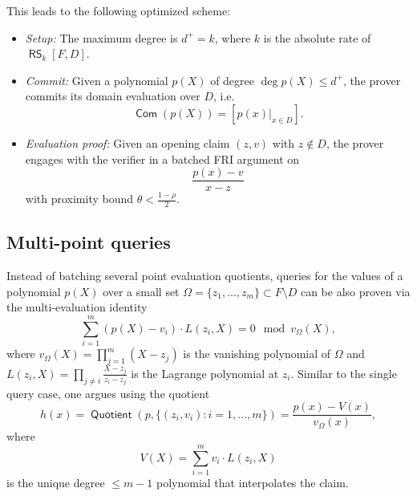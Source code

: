 \documentclass[11pt,article,oneside]{memoir}
\theoremstyle{definition}
\theoremstyle{remark}
\DeclareMathOperator{\comm}{\mathsf{Com}}
\DeclareMathOperator{\RS}{\mathsf{RS}}
\DeclareMathOperator{\Quotient}{\mathsf{Quotient}}
\begin{document}

This leads to the following optimized scheme:
\begin{itemize}
\item
\textit{Setup:} 
The maximum degree is $d^+ = k$, where $k$ is the absolute rate of $\RS_k[F,D]$.
\item
\textit{Commit:} 
Given a polynomial $p(X)$ of degree $\deg p(X)\leq d^+$, the prover commits its domain evaluation over $D$, i.e.
\[ 
\comm(p(X))=[p(x)|_{x\in D}].
\]

\item
\textit{Evaluation proof:} 
Given an opening claim $(z,v)$ with $z\notin D$, the prover engages with the verifier in a batched FRI argument on 
\[
\frac{p(x)-v}{x-z}
\]
with proximity bound $\theta < \frac{1-\rho}{2}$.
\end{itemize}


\subsection{Multi-point queries}
\label{s:MultiPoint}

Instead of batching several point evaluation quotients, queries for the values of a polynomial $p(X)$ over a small set 
$\Omega=\{z_1,...,z_m\}\subset F\setminus D$ can be also proven via the multi-evaluation identity 
\begin{equation}
\label{e:MultiEvalIdentity}
\sum_{i=1}^m (p(X) - v_i) \cdot L(z_i,X) = 0 \mod v_\Omega(X),
\end{equation}
where $v_\Omega(X)= \prod_{j=1}^m (X-z_j)$ is the vanishing polynomial of  $\Omega$ and $L(z_i,X)=\prod_{j\neq i} \frac{X-z_j}{z_i-z_j}$ is the Lagrange polynomial at $z_i$. 
Similar to the single query case, one argues using the quotient
\begin{equation}
\label{e:MultiPointQuotient}
h(x) = \Quotient(p, \{(z_i,v_i):i=1,\ldots,m\}) = \frac{p(x)-V(x)}{v_\Omega(x)},
\end{equation}
where 
\[
V(X)= \sum_{i=1}^m v_i\cdot L(z_i,X)
\] 
is the unique degree $\leq m-1$ polynomial that interpolates the claim. 
\end{document}
